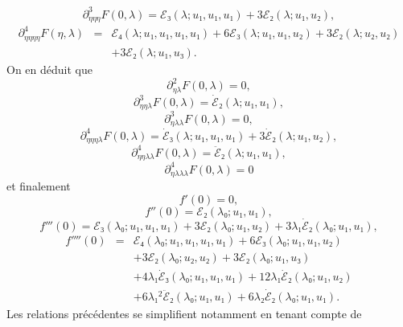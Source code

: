 \documentclass{article}
\begin{document}
\begin{equation} \partial_{η  η  η}^3 F (0, λ) =ℰ₃
   (λ ; u₁, u₁, u₁) + 3ℰ₂ (λ ; u₁, u₂), \end{equation}
\begin{eqnarray}
  \partial_{η  η  η  η}^4 F (η,
  λ) & = & ℰ₄ (λ ; u₁, u₁, u₁, u₁) + 6ℰ₃
  (λ ; u₁, u₁, u₂) + 3ℰ₂ (λ ; u₂, u₂) \nonumber\\
  &  &  + 3ℰ₂ (λ ; u₁, u₃) . \nonumber
\end{eqnarray}
On en déduit que
\begin{equation} \partial_{η  λ}^2 F (0, λ) = 0, \end{equation}
\begin{equation} \partial_{η  η  λ}^3 F (0, λ) =
   \dot{ℰ}₂ (λ ; u₁, u₁), \end{equation}
\begin{equation} \partial_{η  λ  λ}^3 F (0, λ) = 0, \end{equation}
\begin{equation} \partial_{η  η  η  λ}^4 F (0,
   λ) = \dot{ℰ}₃ (λ ; u₁, u₁, u₁) + 3
   \dot{ℰ}₂ (λ ; u₁, u₂), \text{} \text{} \end{equation}
\begin{equation} \partial_{η  η  λ  λ}^4 F (0,
   λ) = \ddot{ℰ}₂ (λ ; u₁, u₁), \end{equation}
\begin{equation} \partial_{η  λ  λ  λ}^4 F (0,
   λ) = 0 \end{equation}
et finalement
\begin{equation} f' (0) = 0, \end{equation}
\begin{equation} f'' (0) =ℰ₂ (λ₀ ; u₁, u₁), \end{equation}
\begin{equation} f''' (0) =ℰ₃ (λ₀ ; u₁, u₁, u₁) + 3ℰ₂
   (λ₀ ; u₁, u₂) + 3 λ₁  \dot{ℰ}₂ (λ₀ ; u₁,
   u₁), \end{equation}
\begin{eqnarray}
  f'''' (0) & = & ℰ₄ (λ₀ ; u₁, u₁, u₁, u₁) +
  6ℰ₃ (λ₀ ; u₁, u₁, u₂) \nonumber\\
  &  &  + 3ℰ₂ (λ₀ ; u₂, u₂) + 3ℰ₂
  (λ₀ ; u₁, u₃) \nonumber\\
  &  &  + 4 λ₁  \dot{ℰ}₃ (λ₀ ; u₁, u₁,
  u₁) + 12 λ₁  \dot{ℰ}₂ (λ₀ ; u₁, u₂) \nonumber\\
  &  &  + 6 λ₁^2  \ddot{ℰ}₂ (λ₀ ; u₁, u₁)
  + 6 λ₂  \dot{ℰ}₂ (λ₀ ; u₁, u₁) . \nonumber
\end{eqnarray}
Les relations précédentes se simplifient notamment en tenant compte de
\end{document}
